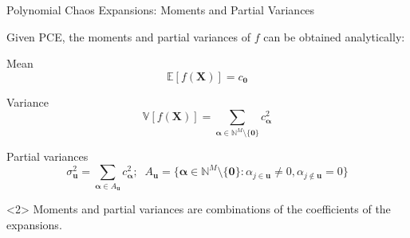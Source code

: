 \documentclass[english,aspectratio=169]{beamer}
\let\tempone\itemize
\let\temptwo\enditemize
\renewenvironment{itemize}{\tempone\addtolength{\itemsep}{0.35\baselineskip}}{\temptwo}
\renewcommand{\emph}[1]{\textcolor[HTML]{006d2c}{\fontseries{sb}\selectfont #1}}
\begin{document}
\begin{frame}[fragile]{Polynomial Chaos Expansions: Moments and Partial Variances}
\small

Given PCE, the moments and partial variances of $f$ can be obtained analytically:
\vspace{1em}
\begin{itemize}
  \item \emph{Mean}
  \begin{equation*}
    \mathbb{E}[f(\bm{X})] = c_{\bm{0}}
  \end{equation*}

  \item \emph{Variance}
  \begin{equation*}
    \mathbb{V}[f(\bm{X})] = \sum_{\bm{\alpha} \in \mathbb{N}^M \setminus \{\bm{0}\}} c_{\bm{\alpha}}^2
  \end{equation*}

  \item \emph{Partial variances}
  \begin{equation*}
    \sigma_{\bm{u}}^2 = \sum_{\bm{\alpha} \in A_{\bm{u}}} c_{\bm{\alpha}}^2;\;\;
    A_{\bm{u}} = \{ \bm{\alpha} \in \mathbb{N}^M \setminus \{\bm{0}\}: \alpha_{j \in \bm{u}} \neq 0, \alpha_{j \notin \bm{u}} = 0 \}
  \end{equation*}
\end{itemize}

\begin{exampleblock}<2>{}
  \centering
  Moments and partial variances are combinations of the coefficients of the expansions.
\end{exampleblock}

\end{frame}
\end{document}
